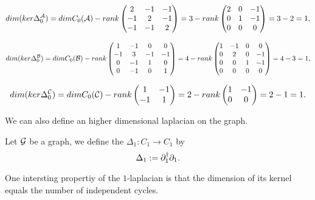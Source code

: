 \documentclass[../2.tex]{subfiles}
\begin{document}
\begin{exa}
        \[dim(ker\Delta_0^{\mathcal{A}}) =dimC_0(\mathcal{A}) - rank
        \begin{pmatrix}
            2 & -1 & -1  \\
            -1 & 2 & -1  \\
            -1 & -1 & 2 
        \end{pmatrix} = 3 - rank
        \begin{pmatrix}
            2 & 0 & -1  \\
            0 & 1 & -1  \\
            0 & 0 & 0 
        \end{pmatrix} = 3 - 2 =  1, \]

        \[ dim(ker\Delta_0^{\mathcal{B}}) =dimC_0(\mathcal{B}) - rank
        \begin{pmatrix}
            1 & -1 & 0 & 0  \\
            -1 & 3 & -1 & -1 \\
            0 & -1 & 1 & 0  \\
            0 & -1 & 0 & 1 
        \end{pmatrix} = 4 - rank
        \begin{pmatrix}
            1 & -1 & 0 & 0  \\
            0 & 2 & 0 & -1 \\
            0 & 0 & 1 & -1  \\
            0 & 0 & 0 & 0 
        \end{pmatrix} = 4 - 3 = 1,\]
        
        \[ dim(ker\Delta_0^{\mathcal{C}}) =dimC_0(\mathcal{C}) - rank
        \begin{pmatrix}
            1 & -1 \\
            -1 & 1
        \end{pmatrix} = 2 - rank
        \begin{pmatrix}
            1 & -1 \\
            0 & 0
        \end{pmatrix} = 2-1 = 1.\]
    \end{exa}

    We can also define an higher dimensional laplacian on the graph.

    \begin{defn}
        Let $\mathcal{G}$ be a graph, we define the  $\Delta_1 : C_1 \to C_1$ by 
        \[ \Delta_1 := \partial_1^\dagger \partial_1.\]
    \end{defn}

    One intersting propertiy of the $1$-laplacian is that the dimension of its kernel equals the number of independent cycles.
\end{document}
